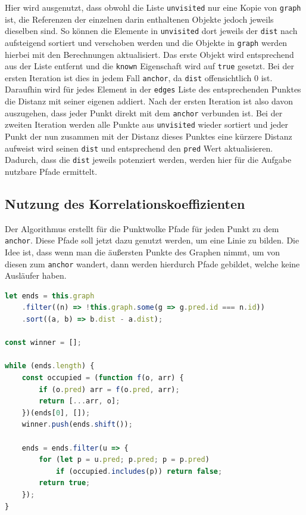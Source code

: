 Hier wird ausgenutzt, dass obwohl die Liste \lstinline{unvisited} nur eine Kopie von \lstinline{graph} ist, die Referenzen der einzelnen darin enthaltenen Objekte jedoch jeweils dieselben sind.
So können die Elemente in \lstinline{unvisited} dort jeweils der \lstinline{dist} nach aufsteigend sortiert und verschoben werden und die Objekte in \lstinline{graph} werden hierbei mit den Berechnungen aktualisiert.
Das erste Objekt wird entsprechend aus der Liste entfernt und die \lstinline{known} Eigenschaft wird auf \lstinline{true} gesetzt.
Bei der ersten Iteration ist dies in jedem Fall \lstinline{anchor}, da \lstinline{dist} offensichtlich $0$ ist.
Daraufhin wird für jedes Element in der \lstinline{edges} Liste des entsprechenden Punktes die Distanz mit seiner eigenen addiert.
Nach der ersten Iteration ist also davon auszugehen, dass jeder Punkt direkt mit dem \lstinline{anchor} verbunden ist.
Bei der zweiten Iteration werden alle Punkte aus \lstinline{unvisited} wieder sortiert und jeder Punkt der nun zusammen mit der Distanz dieses Punktes eine kürzere Distanz aufweist wird seinen \lstinline{dist} und entsprechend den \lstinline{pred} Wert aktualisieren.
Dadurch, dass die \lstinline{dist} jeweils potenziert werden, werden hier für die Aufgabe nutzbare Pfade ermittelt.

\subsection{Nutzung des Korrelationskoeffizienten}

Der  Algorithmus erstellt für die Punktwolke Pfade für jeden Punkt zu dem \lstinline{anchor}.
Diese Pfade soll jetzt dazu genutzt werden, um eine Linie zu bilden.
Die Idee ist, dass wenn man die äu{\ss}ersten Punkte des Graphen nimmt, um von diesen zum \lstinline{anchor} wandert, dann werden hierdurch Pfade gebildet, welche keine Ausläufer haben.

\begin{lstlisting}[language=JavaScript, caption={Bestimmung der äu{\ss}ersten Knoten zur Bestimmung von Geraden durch den Korrelationskoeffizienten in der \lstinline{groupsByCorrelation} Funktion innerhalb der \lstinline{Dijkstra} Klasse.}, label={lst:dijkstra_correlation_part1}]
let ends = this.graph
    .filter((n) => !this.graph.some(g => g.pred.id === n.id))
    .sort((a, b) => b.dist - a.dist);

const winner = [];

while (ends.length) {
    const occupied = (function f(o, arr) {
        if (o.pred) arr = f(o.pred, arr);
        return [...arr, o];
    })(ends[0], []);
    winner.push(ends.shift());

    ends = ends.filter(u => {
        for (let p = u.pred; p.pred; p = p.pred)
            if (occupied.includes(p)) return false;
        return true;
    });
}
\end{lstlisting}

